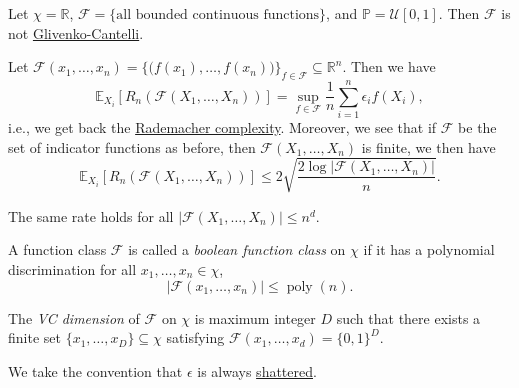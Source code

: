 \begin{eg}
	Let \(\chi = \mathbb{R} \), \(\mathscr{F} = \{ \text{all bounded continuous functions} \} \), and \(\mathbb{P} = \mathcal{U} [0, 1]\). Then \(\mathscr{F} \) is not \hyperref[def:Glivenko-Cantelli]{Glivenko-Cantelli}.
\end{eg}

Let \(\mathscr{F} (x_1, \dots , x_n) = \{ \big(f(x_1), \dots , f(x_n)\big) \} _{f\in \mathscr{F} } \subseteq \mathbb{R} ^n\). Then we have
\[
	\mathbb{E}_{X_i}\left[R_n( \mathscr{F} (X_1, \dots , X_n)) \right]
	= \sup _{f\in \mathscr{F} }\frac{1}{n}\sum_{i=1}^{n} \epsilon _i f(X_i),
\]
i.e., we get back the \hyperref[def:Rademacher-complexity]{Rademacher complexity}. Moreover, we see that if \(\mathscr{F} \) be the set of indicator functions as before, then \(\mathscr{F} (X_1, \dots , X_n)\) is finite, we then have
\[
	\mathbb{E}_{X_i}\left[R_n(\mathscr{F} (X_1, \dots , X_n)) \right]
	\leq 2 \sqrt{\frac{2 \log \vert \mathscr{F} (X_1, \dots , X_n) \vert }{n}} .
\]

\begin{remark}
	The same rate holds for all \(\vert \mathscr{F} (X_1, \dots , X_n) \vert \leq n^d\).
\end{remark}

\begin{definition}\label{def:boolean-function-class}
	A function class \(\mathscr{F} \) is called a \emph{boolean function class} on \(\chi \) if it has a polynomial discrimination for all \(x_1, \dots , x_n\in \chi \),
	\[
		\left\vert \mathscr{F} (x_1, \dots , x_n) \right\vert \leq \mathop{\mathrm{poly}}(n).
	\]
\end{definition}

\begin{definition}[VC dimension]\label{def:VC-dimension}
	The \emph{VC dimension} of \(\mathscr{F} \) on \(\chi \) is maximum integer \(D\) such that there exists a finite set \(\{ x_1, \dots , x_D \} \subseteq \chi \) satisfying \(\mathscr{F} (x_1, \dots , x_d) = \{ 0, 1 \} ^D\).
\end{definition}

\begin{definition}[Shatter]\label{def:shatter}

\end{definition}

\begin{remark}
	We take the convention that \(\epsilon \) is always \hyperref[def:shatter]{shattered}.
\end{remark}

